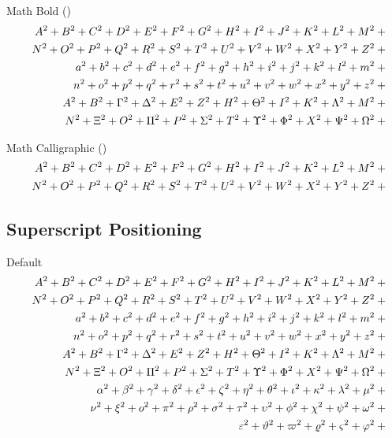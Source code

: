 
Math Bold (\texttt{\string\mathbf})
\def\test#1{|\mathbf{#1}|+{}}%
\begin{eqnarray*}
  && {\testupperi}\\
  && {\testupperii}\\
  && {\testloweri}\\
  && {\testlowerii}\\
  && {\testupgreeki}\\
  && {\testupgreekii}
\end{eqnarray*}%

Math Calligraphic (\texttt{\string\mathcal})
\def\test#1{|\mathcal{#1}|+{}}%
\begin{eqnarray*}
  && {\testupperi}\\
  && {\testupperii}
\end{eqnarray*}%


\subsection{Superscript Positioning \showfamily}

Default
\def\test#1{#1^{2}+{}}%
\begin{eqnarray*}
  && {\testupperi}\\
  && {\testupperii}\\
  && {\testloweri}\\
  && {\testlowerii}\\
  && {\testupgreeki}\\
  && {\testupgreekii}\\
  && {\testlowgreeki}\\
  && {\testlowgreekii}\\
  && {\testlowgreekiii}
\end{eqnarray*}%

